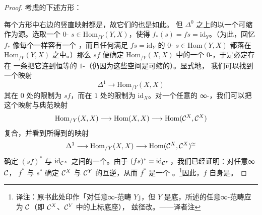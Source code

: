 \begin{proof}
考虑\trSimplicialSets{}的下述\trPullback{}方形：
\begin{center}
\qquad
{}
\end{center}
每个方形中右边的竖直映射都是\trTrivialFibration{}，故它们的\trPullback{}也是如此。
但 $\Delta^0$ 之上的\trTrivialFibration{}以一个可缩\trKanComplex{}作为源。选取一个
$0$-\trSimplex{} $s \in \mathrm{Hom}_{/Y}(Y, X)$，使得
$f_*(s) = fs = \mathrm{id}_Y$。（为此，回忆 $f_*$ 像每个\trTrivialFibration{}一样容有一个%
\trSectionMap{}，而且任何满足 $fs = \mathrm{id}_Y$ 的 $0$-\trSimplex{}%
$s \in \mathrm{Hom}(Y, X)$ 都落在 $\mathrm{Hom}_{/Y}(Y, X)$ 之中。）那么
$sf$ 便确定 $\mathrm{Hom}_{/Y}(X, X)$ 中的一个 $0$-\trSimplex{}，于是必定存在
一条把它连到恒等的 $1$-\trSimplex{}（仍因为这些\trSectionMap{}空间是可缩的）。显式地，
我们可以找到一个映射
\[
\Delta^1 \longrightarrow \mathrm{Hom}_{/Y}(X, X)
\]
其在 $0$ 处的限制为 $sf$，而在 $1$ 处的限制为 $\mathrm{id}_X$。对一个任意的
∞-\trCategory{}，我们可以把这个映射与典范映射
\[
\mathrm{Hom}_{/Y}(X, X) \longrightarrow \mathrm{Hom}(X, X)
\longrightarrow \mathrm{Hom}(\mathcal{C}^X, \mathcal{C}^X)
\]
复合，并看到所得到的映射
\[
\Delta^1 \longrightarrow \mathrm{Hom}_{/Y}(X, X)
\longrightarrow \mathrm{Hom}(\mathcal{C}^X, \mathcal{C}^X)^{\simeq}
\]
确定 $(sf)^*$ 与 $\mathrm{id}_{\mathcal{C}^X}$ 之间的一个\trNaturalEquivalence{}。由于
$(fs)^* = \mathrm{id}_{\mathcal{C}^Y}$，我们已经证明：对任意∞-\trCategory{} $\mathcal{C}$，
$f^*$ 与 $s^*$ 确定 $\mathcal{C}^X$ 与 $\mathcal{C}^Y$ 的互逆\trEquivalence{}，从而 $f^*$ 是一个%
\trJoyalEquivalence{}。\footnote{译注：原书此处印作「对任意∞-范畴 $Y$」，但
$Y$ 是底\trSimplicialSet{}，所述的任意∞-范畴应为 $\mathcal{C}$（即 $\mathcal{C}^X$、$\mathcal{C}^Y$ 中的上标底座），
兹径改。——译者注}因此，$f$ 自身是\trJoyalEquivalence{}。
\end{proof}

